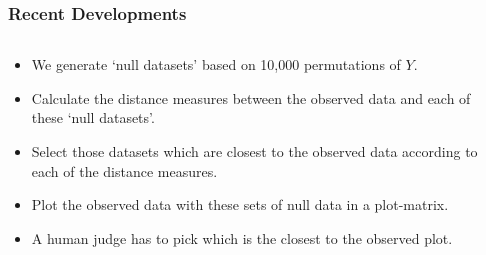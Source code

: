 \documentclass{beamer}
\begin{document}
\begin{frame}
\frametitle{Recent Developments}
	\begin{columns}

	\begin{column}{0.55\textwidth}
		\begin{itemize}
		\item We generate `null datasets' based on 10,000 permutations of $Y$.
		\item Calculate the distance measures between the observed data and each of these `null datasets'. 
		\item Select those datasets which are closest to the observed data according to each of  the distance measures.
		\item Plot the observed data with these sets of null data in a plot-matrix.
		\item A human judge has to pick which is the closest to the observed plot.
		\end{itemize}
	\end{column}

	\begin{column}{0.45\textwidth}
		 \begin{center}
		 \end{center}
	\end{column}
\end{columns}
\end{frame}
\end{document}
